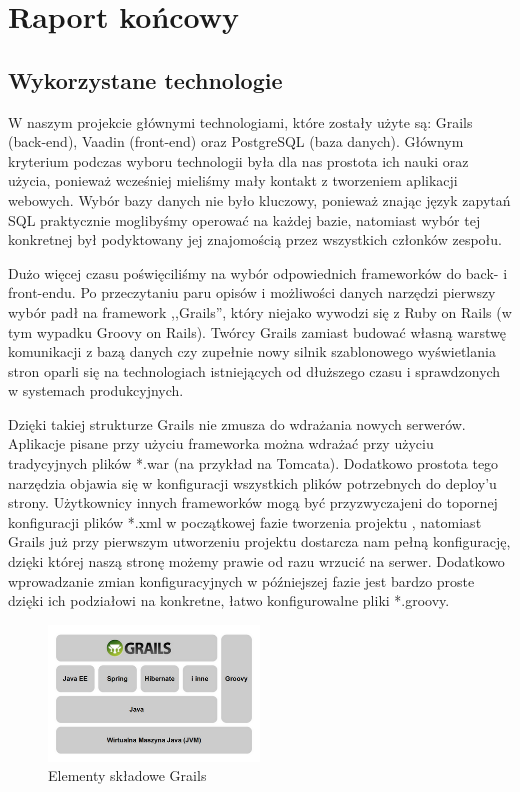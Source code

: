 
\chapter{Raport końcowy}
\label{cha:raport}

\section{Wykorzystane technologie}
\label{sec:technologie}

\hspace{15pt}W naszym projekcie głównymi technologiami, które zostały użyte są: Grails (back-end), Vaadin (front-end) oraz PostgreSQL (baza danych). Głównym kryterium podczas wyboru technologii była dla nas prostota ich nauki oraz użycia, ponieważ wcześniej mieliśmy mały kontakt z tworzeniem aplikacji webowych. Wybór bazy danych nie było kluczowy, ponieważ znając język zapytań SQL praktycznie moglibyśmy operować na każdej bazie, natomiast wybór tej konkretnej był podyktowany jej znajomością przez wszystkich członków zespołu. 

\hspace{15pt}Dużo więcej czasu poświęciliśmy na wybór odpowiednich frameworków do back- i front-endu. Po przeczytaniu paru opisów i możliwości danych narzędzi pierwszy wybór padł na framework ,,Grails'', który niejako wywodzi się z Ruby on Rails (w tym wypadku Groovy on Rails). Twórcy Grails zamiast budować własną warstwę komunikacji z bazą danych czy zupełnie nowy silnik szablonowego wyświetlania stron oparli się na technologiach istniejących od dłuższego czasu i sprawdzonych w systemach produkcyjnych. 

\hspace{15pt}Dzięki takiej strukturze Grails nie zmusza do wdrażania nowych serwerów. Aplikacje pisane przy użyciu frameworka można wdrażać przy użyciu tradycyjnych plików *.war (na przykład na Tomcata). Dodatkowo prostota tego narzędzia objawia się w konfiguracji wszystkich plików potrzebnych do deploy'u strony. Użytkownicy innych frameworków mogą być przyzwyczajeni do topornej konfiguracji plików *.xml w początkowej fazie tworzenia projektu , natomiast Grails już przy pierwszym utworzeniu projektu dostarcza nam pełną konfigurację, dzięki której naszą stronę możemy prawie od razu wrzucić na serwer. Dodatkowo wprowadzanie zmian konfiguracyjnych w późniejszej fazie jest bardzo proste dzięki ich podziałowi na konkretne, łatwo konfigurowalne pliki *.groovy. 

\begin{figure}[h!]
\begin{center}
\includegraphics[width=0.5\textwidth]{./img/grails_stack.png}
\caption{Elementy składowe Grails}
\label{fig:grails-stack}
\end{center}
\end{figure}

